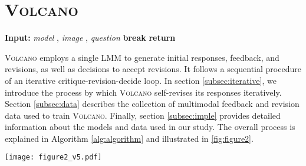 \documentclass[11pt]{article}
\newcommand{\Ours}{\textsc{Volcano}}
\begin{document}
\section{{\Ours}}
\label{sec:volcano}
\begin{algorithm}[t]
\caption{Feedback guided self-revision}
\begin{algorithmic}[1]
\State \textbf{Input:} \textit{model }, \textit{image }, \textit{question }
\State \textit{}
\State \textit{}
    \State \textit{} \hspace{0.3cm}
    \State \textit{} \hspace{0.3cm}
    \State \textit{} \hspace{0.3cm}
    \If {}
        \State \textbf{break}
    \Else
        \State \textit{}
    \EndIf
\EndFor
\State \textbf{return} \textit{}
\end{algorithmic}
\label{alg:algorithm}
\end{algorithm}
{\Ours} employs a single LMM to generate initial responses, feedback, and revisions, as well as decisions to accept revisions. It follows a sequential procedure of an iterative critique-revision-decide loop. In section \ref{subsec:iterative}, we introduce the process by which {\Ours} self-revises its responses iteratively. Section \ref{subsec:data} describes the collection of multimodal feedback and revision data used to train {\Ours}. Finally, section \ref{subsec:imple} provides detailed information about the models and data used in our study. The overall process is explained in Algorithm \autoref{alg:algorithm} and illustrated in \autoref{fig:figure2}.
\begin{figure*}[ht]
\texttt{[image: figure2\_v5.pdf]}
\caption{\textbf{Overall process of {\Ours}.} {\Ours} is a multimodal self-feedback guided revision model that takes an image and a question and then generates an improved response based on the self-feedback.}
\label{fig:figure2}
\end{figure*}
\end{document}
